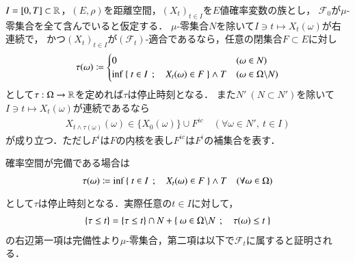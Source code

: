 	\begin{itembox}[l]{}
		\begin{thm}[閉集合と停止時刻]
			$I = [0,T] \subset \mathbb{R}$，$(E,\rho)$を距離空間，$(X_t)_{t \in I}$を$E$値確率変数の族とし，
			$\mathcal{F}_0$が$\mu$-零集合を全て含んでいると仮定する．
			$\mu$-零集合$N$を除いて$I \ni t \longmapsto X_t(\omega)$が右連続で，
			かつ$(X_t)_{t \in I}$が$(\mathcal{F}_t)$-適合であるなら，任意の閉集合$F \subset E$に対し
			\begin{align}
				\tau(\omega) \coloneqq
				\begin{cases}
					0 & (\omega \in N) \\
					\operatorname*{inf}_{} \left\{\ t \in I\ \, ; \quad X_t(\omega) \in F\ \right\} \wedge T & (\omega \in \Omega \backslash N)
				\end{cases}
			\end{align}
			として$\tau:\Omega \rightarrow \mathbb{R}$を定めれば$\tau$は停止時刻となる．
			また$N'\ (N \subset N')$を除いて$I \ni t \longmapsto X_t(\omega)$が連続であるなら
			\begin{align}
				X_{t \wedge \tau(\omega)}(\omega) \in \{ X_0(\omega) \} \cup F^{ic} \quad (\forall \omega \in N',\ t \in I)
			\end{align}
			が成り立つ．ただし$F^i$は$F$の内核を表し$F^{ic}$は$F^i$の補集合を表す．
			\label{thm:closed_set_stopping_time}
		\end{thm}
	\end{itembox}
	確率空間が完備である場合は
	\begin{align}
		\tau(\omega) \coloneqq \operatorname*{inf}_{} \left\{\ t \in I\ \, ; \quad X_t(\omega) \in F\ \right\} \wedge T
		\quad (\forall \omega \in \Omega)
	\end{align}
	として$\tau$は停止時刻となる．実際任意の$t \in I$に対して，
	\begin{align}
		\{\tau \leq t\} = \{\tau \leq t\} \cap N + \left\{\ \omega \in \Omega \backslash N\ \, ; \quad \tau(\omega) \leq t\ \right\}
	\end{align}
	の右辺第一項は完備性より$\mu$-零集合，第二項は以下で$\mathcal{F}_t$に属すると証明される．

